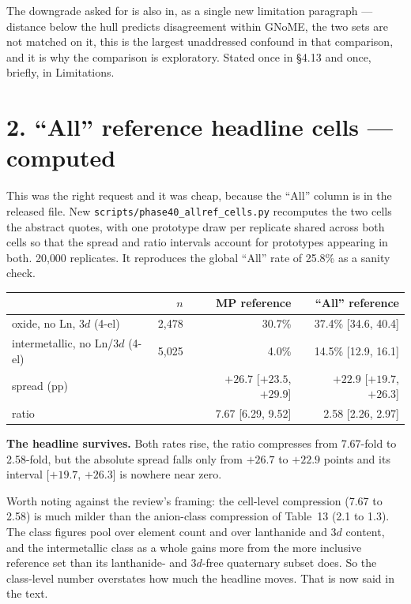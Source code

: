 \documentclass[11pt]{article}
\begin{document}
The downgrade asked for is also in, as a single new limitation paragraph --- distance below
the hull predicts disagreement within GNoME, the two sets are not matched on it, this is
the largest unaddressed confound in that comparison, and it is why the comparison is
exploratory. Stated once in \S4.13 and once, briefly, in Limitations.

\section*{2. ``All'' reference headline cells --- computed}

This was the right request and it was cheap, because the ``All'' column is in the released
file. New \texttt{scripts/phase40\_allref\_cells.py} recomputes the two cells the abstract
quotes, with one prototype draw per replicate shared across both cells so that the spread
and ratio intervals account for prototypes appearing in both. 20{,}000 replicates. It
reproduces the global ``All'' rate of 25.8\% as a sanity check.

\begin{center}
\begin{tabular}{lrrr}
\toprule
 & $n$ & MP reference & ``All'' reference \\
\midrule
oxide, no Ln, 3$d$ (4-el)        & 2{,}478 & 30.7\% & 37.4\% [34.6, 40.4] \\
intermetallic, no Ln/3$d$ (4-el) & 5{,}025 & 4.0\%  & 14.5\% [12.9, 16.1] \\
\midrule
spread (pp)                      &         & $+26.7$ [$+23.5$, $+29.9$] & $+22.9$ [$+19.7$, $+26.3$] \\
ratio                            &         & 7.67 [6.29, 9.52] & 2.58 [2.26, 2.97] \\
\bottomrule
\end{tabular}
\end{center}

\textbf{The headline survives.} Both rates rise, the ratio compresses from 7.67-fold to
2.58-fold, but the absolute spread falls only from $+26.7$ to $+22.9$ points and its
interval [$+19.7$, $+26.3$] is nowhere near zero.

Worth noting against the review's framing: the cell-level compression (7.67 to 2.58) is
much milder than the anion-class compression of Table~13 (2.1 to 1.3). The class figures
pool over element count and over lanthanide and 3$d$ content, and the intermetallic class
as a whole gains more from the more inclusive reference set than its lanthanide- and
3$d$-free quaternary subset does. So the class-level number overstates how much the
headline moves. That is now said in the text.
\end{document}

